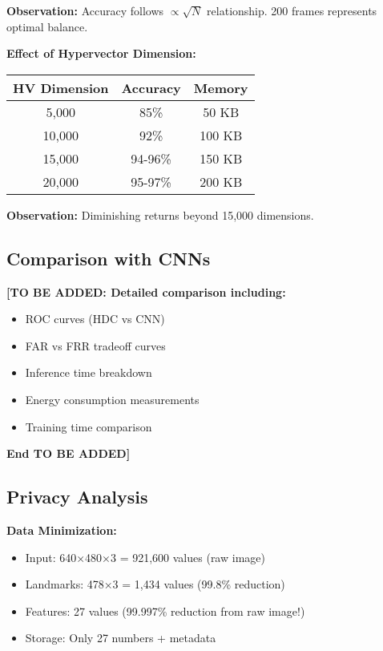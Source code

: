 \documentclass[a4paper,12pt]{article}
\begin{document}
\textbf{Observation:} Accuracy follows $\propto \sqrt{N}$ relationship. 200 frames represents optimal balance.

\textbf{Effect of Hypervector Dimension:}

\begin{center}
\begin{tabular}{|c|c|c|}
\hline
\textbf{HV Dimension} & \textbf{Accuracy} & \textbf{Memory} \\
\hline
5,000 & 85\% & 50 KB \\
10,000 & 92\% & 100 KB \\
15,000 & 94-96\% & 150 KB \\
20,000 & 95-97\% & 200 KB \\
\hline
\end{tabular}
\end{center}

\textbf{Observation:} Diminishing returns beyond 15,000 dimensions.

\subsection{Comparison with CNNs}

\textbf{[TO BE ADDED: Detailed comparison including:}
\begin{itemize}
    \item ROC curves (HDC vs CNN)
    \item FAR vs FRR tradeoff curves
    \item Inference time breakdown
    \item Energy consumption measurements
    \item Training time comparison
\end{itemize}
\textbf{End TO BE ADDED]}

\subsection{Privacy Analysis}

\textbf{Data Minimization:}
\begin{itemize}
    \item Input: 640×480×3 = 921,600 values (raw image)
    \item Landmarks: 478×3 = 1,434 values (99.8\% reduction)
    \item Features: 27 values (99.997\% reduction from raw image!)
    \item Storage: Only 27 numbers + metadata
\end{itemize}
\end{document}
